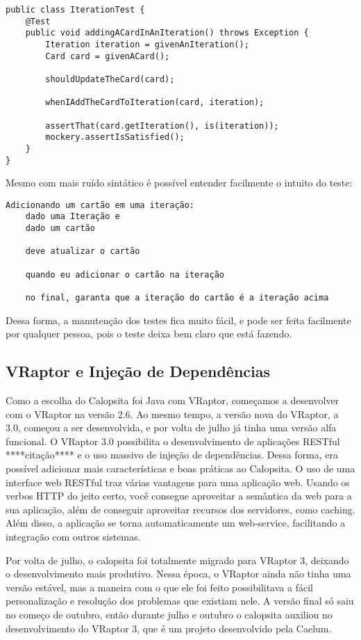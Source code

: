 \begin{lstlisting}
public class IterationTest {
	@Test
	public void addingACardInAnIteration() throws Exception {
		Iteration iteration = givenAnIteration();
		Card card = givenACard();

		shouldUpdateTheCard(card);

		whenIAddTheCardToIteration(card, iteration);

		assertThat(card.getIteration(), is(iteration));
		mockery.assertIsSatisfied();
	}
}
\end{lstlisting}

Mesmo com mais ruído sintático é possível entender facilmente o intuito do teste:

\begin{verbatim}
Adicionando um cartão em uma iteração:
	dado uma Iteração e
	dado um cartão
  
	deve atualizar o cartão
  
	quando eu adicionar o cartão na iteração
  
	no final, garanta que a iteração do cartão é a iteração acima
\end{verbatim}

Dessa forma, a manutenção dos testes fica muito fácil, e pode ser feita facilmente por qualquer pessoa, pois o teste deixa bem claro que está fazendo.


\subsection{VRaptor e Injeção de Dependências}

Como a escolha do Calopsita foi Java com VRaptor, começamos a desenvolver com o VRaptor na versão 2.6. 
Ao mesmo tempo, a versão nova do VRaptor, a 3.0, começou a ser desenvolvida, e por volta de julho já tinha 
uma versão alfa funcional. O VRaptor 3.0 possibilita o desenvolvimento de aplicações RESTful ****citação**** 
e o uso massivo de injeção de dependências\cite{dsl}. Dessa forma, era possível adicionar mais 
características e boas práticas ao Calopsita. O uso de uma interface web RESTful traz várias vantagens para 
uma aplicação web. Usando os verbos HTTP do jeito certo, você consegue aproveitar a semântica da web para a 
sua aplicação, além de conseguir aproveitar recursos dos servidores, como caching. Além disso, a aplicação 
se torna automaticamente um web-service, facilitando a integração com outros sistemas.

Por volta de julho, o calopsita foi totalmente migrado para VRaptor 3, deixando o desenvolvimento mais produtivo. 
Nessa época, o VRaptor ainda não tinha uma versão estável, mas a maneira com o que ele foi feito possibilitava a fácil
personalização e resolução dos problemas que existiam nele. A versão final só saiu no começo de outubro, então durante 
julho e outubro o calopsita auxiliou no desenvolvimento do VRaptor 3, que é um projeto \opensource desenvolvido pela Caelum.

